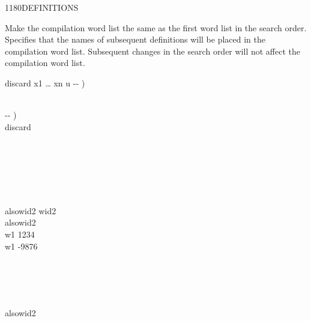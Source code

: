 \begin{worddef}{1180}{DEFINITIONS}
\item \stack{}{}

	Make the compilation word list the same as the first word list
	in the search order. Specifies that the names of subsequent
	definitions will be placed in the compilation word list.
	Subsequent changes in the search order will not affect the
	compilation word list.


	\begin{implement} %
		\word{:} discard  x1 {\ldots} xn u -{}- ) \bs{}  \\
		    \\
		\word{;}

		\word{:}   -{}- ) \\
		\tab {}    discard \\
		\word{;}
	\end{implement}

	\begin{testing} %
		\ttfamily
		 \\

		 \\
		 \\
		 \\

		\word{:} alsowid2   wid2      \word{;} \\
		alsowid2 \\
		\word{:} w1 1234 \word{;} \\
		\word{:} w1 -9876 \word{;} 

		  \\
		 \\
		 \\
		 \\
		alsowid2 \\
		 \\


\end{testing}
\end{worddef}
